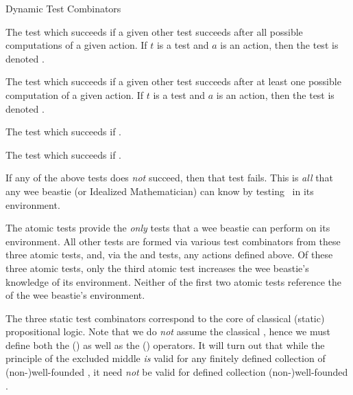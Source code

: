 \stopitemize

\item Dynamic Test Combinators

\startitemize[n]

\item The test which succeeds if a given other test succeeds after all 
possible computations of a given action. If $t$ is a test and $a$ is an 
action, then the  test is denoted . 

\item The test which succeeds if a given other test succeeds after at 
least one possible computation of a given action. If $t$ is a test and $a$ 
is an action, then the  test is denoted 
. 

\item The test which succeeds if .

\item The test which succeeds if . 

\stopitemize

\stopitemize

If any of the above tests does \emph{not} succeed, then that test fails. 
This is \emph{all} that any wee beastie (or Idealized Mathematician) can 
know by testing \lols\ in its environment. 

\stopDefinition

\startMMundi

The atomic tests provide the \emph{only} tests that a wee beastie can 
perform \emph{} on its environment. All other tests are 
formed via various test combinators from these three atomic tests, and, 
via the  and  tests, any actions 
defined above. Of these three atomic tests, only the third atomic test 
increases the wee beastie's knowledge of its environment. Neither of the 
first two atomic tests reference the  of the wee beastie's 
environment. 

The three static test combinators correspond to the core of classical 
(static) propositional logic. Note that we do \emph{not} assume the 
classical , hence we must define 
both the   () as well as the 
  () operators. It will turn 
out that while the principle of the excluded middle \emph{is} valid for 
any finitely defined collection of (non-)well-founded \lols, it need 
\emph{not} be valid for  defined collection 
(non-)well-founded \lols. 


